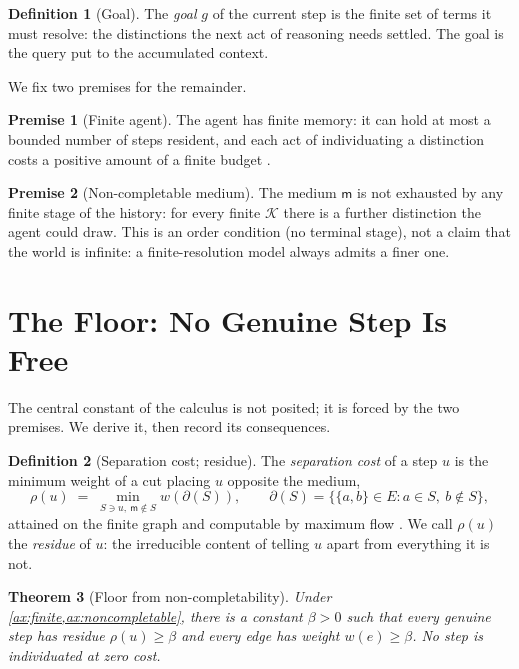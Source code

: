 \documentclass[11pt,twocolumn,a4paper]{article}
\theoremstyle{thmstyle}
\newtheorem{theorem}{Theorem}[section]
\theoremstyle{definition}
\newtheorem{definition}[theorem]{Definition}
\newtheorem{axiom}{Premise}
\theoremstyle{remark}
\newcommand{\Ctx}{\mathcal{K}}          %
\newcommand{\Edg}{E}
\newcommand{\wt}{w}
\newcommand{\med}{\mathsf{m}}           %
\newcommand{\flo}{\beta}                %
\newcommand{\cut}{\partial}
\newcommand{\res}{\rho}                 %
\newcommand{\goal}{g}                   %
\newcommand{\set}[1]{\{#1\}}
\begin{document}
\begin{definition}[Goal]
\label{def:goal}
The \emph{goal} $\goal$ of the current step is the finite set of terms it must
resolve: the distinctions the next act of reasoning needs settled. The goal is
the query put to the accumulated context.
\end{definition}

We fix two premises for the remainder.

\begin{axiom}[Finite agent]
\label{ax:finite}
The agent has finite memory: it can hold at most a bounded number of steps
resident, and each act of individuating a distinction costs a positive amount of
a finite budget \citep{simon1955,simon1956}.
\end{axiom}

\begin{axiom}[Non-completable medium]
\label{ax:noncompletable}
The medium $\med$ is not exhausted by any finite stage of the history: for every
finite $\Ctx$ there is a further distinction the agent could draw. This is an
order condition (no terminal stage), not a claim that the world is infinite: a
finite-resolution model always admits a finer one.
\end{axiom}

\section{The Floor: No Genuine Step Is Free}
\label{sec:floor}

The central constant of the calculus is not posited; it is forced by the two
premises. We derive it, then record its consequences.

\begin{definition}[Separation cost; residue]
\label{def:residue}
The \emph{separation cost} of a step $u$ is the minimum weight of a cut placing
$u$ opposite the medium,
\[
\res(u)\;=\;\min_{S\ni u,\ \med\notin S}\wt(\cut(S)),
\qquad
\cut(S)=\set{\set{a,b}\in\Edg : a\in S,\ b\notin S},
\]
attained on the finite graph and computable by maximum flow
\citep{fordfulkerson1956,menger1927}. We call $\res(u)$ the \emph{residue} of
$u$: the irreducible content of telling $u$ apart from everything it is not.
\end{definition}

\begin{theorem}[Floor from non-completability]
\label{thm:floor}
Under \cref{ax:finite,ax:noncompletable}, there is a constant $\flo>0$ such that
every genuine step has residue $\res(u)\ge\flo$ and every edge has weight
$\wt(e)\ge\flo$. No step is individuated at zero cost.
\end{theorem}
\end{document}
